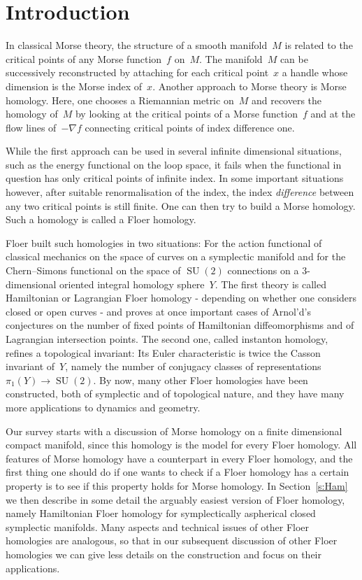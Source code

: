 \documentclass[12pt,twoside]{amsart}
\theoremstyle{plain}
\numberwithin{figure}{section}
\numberwithin{equation}{section}
\def\SU{\operatorname{SU}}
\begin{document}



\section{Introduction}  \label{s:intro}

In classical Morse theory, 
the structure of a smooth manifold~$M$ is related to the critical
points of any Morse function~$f$ on~$M$. 
The manifold~$M$ can be successively reconstructed 
by attaching for each critical point~$x$ a handle whose dimension is the Morse index of~$x$.
Another approach to Morse theory is Morse homology. 
Here, one chooses a Riemannian metric on~$M$ and recovers the homology of~$M$ 
by looking at the critical points of a Morse function~$f$ and at the flow lines
of~$-\nabla f$ connecting critical points of index difference one. 

While the first approach can be used in several infinite dimensional situations, 
such as the energy functional on the loop space, it fails when the functional 
in question has only critical points of infinite index. 
In some important situations however, after suitable renormalisation of the index,  
the index {\it difference}\/ between any two critical points 
is still finite. One can then try to build a Morse homology. 
Such a homology is called a Floer homology.

Floer built such homologies in two situations: 
For the action functional of classical mechanics on the space of curves on a symplectic manifold 
and for the Chern--Simons functional on the space of $\SU (2)$ connections 
on a 3-dimensional oriented integral homology sphere~$Y$.
The first theory is called Hamiltonian or Lagrangian Floer homology - 
depending on whether one considers closed or open curves 
- and proves at once important cases of Arnol'd's conjectures on the number 
of fixed points of Hamiltonian diffeomorphisms and of Lagrangian intersection points.
The second one, called instanton homology, refines a topological invariant:
Its Euler characteristic is twice the Casson invariant of~$Y$, 
namely the number of conjugacy classes of representations $\pi_1(Y) \to \SU (2)$.
%
By now, many other Floer homologies have been constructed, 
both of symplectic and of topological nature,
and they have many more applications to dynamics and geometry.

Our survey starts with a discussion of Morse homology on a finite dimensional compact manifold,
since this homology is the model for every Floer homology.
All features of Morse homology have a counterpart in every Floer homology, 
and the first thing one should do if one wants to check if a Floer homology has a certain property 
is to see if this property holds for Morse homology.
%
In Section~\ref{s:Ham} we then describe in some detail the arguably easiest version of Floer homology, 
namely Hamiltonian Floer homology for symplectically aspherical closed symplectic manifolds.
Many aspects and technical issues of other Floer homologies are analogous, so that in our subsequent discussion of
other Floer homologies we can give less details on the construction and
focus on their applications.
\end{document}
